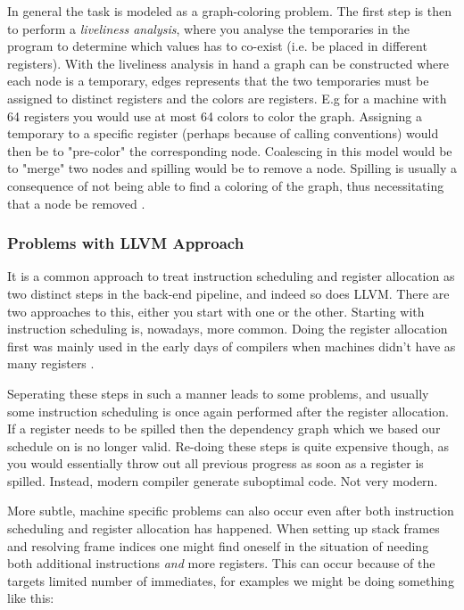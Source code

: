 In general the task is modeled as a graph-coloring problem. The first step is then to
perform a \textit{liveliness analysis}, where you analyse the temporaries in the program
to determine which values has to co-exist (i.e. be placed in different registers). With
the liveliness analysis in hand a graph can be constructed where each node is a temporary,
edges represents that the two temporaries must be assigned to distinct registers and the
colors are registers. E.g for a machine with 64 registers you would use at most 64 colors
to color the graph. Assigning a temporary to a specific register (perhaps because of
calling conventions) would then be to "pre-color" the corresponding node. Coalescing in
this model would be to "merge" two nodes and spilling would be to remove a node. Spilling
is usually a consequence of not being able to find a coloring of the graph, thus
necessitating that a node be removed \cite{alloc-deconstructed}.

\subsubsection{Problems with LLVM Approach}
It is a common approach to treat instruction scheduling and register allocation as two
distinct steps in the back-end pipeline, and indeed so does LLVM. There are two approaches
to this, either you start with one or the other. Starting with instruction scheduling is,
nowadays, more common. Doing the register allocation first was mainly used in the early
days of compilers when machines didn't have as many registers \cite[\pno~3]{combining-alloc-sched}.

Seperating these steps in such a manner leads to some problems, and usually some instruction
scheduling is once again performed after the register allocation. If a register needs to be
spilled then the dependency graph which we based our schedule on is no longer valid. Re-doing
these steps is quite expensive though, as you would essentially throw out all previous
progress as soon as a register is spilled. Instead, modern compiler generate suboptimal
code. Not very modern.

More subtle, machine specific problems can also occur even after both instruction scheduling
and register allocation has happened. When setting up stack frames and resolving frame
indices one might find oneself in the situation of needing both additional instructions
\textit{and} more registers. This can occur because of the targets limited number of immediates,
for examples we might be doing something like this:

